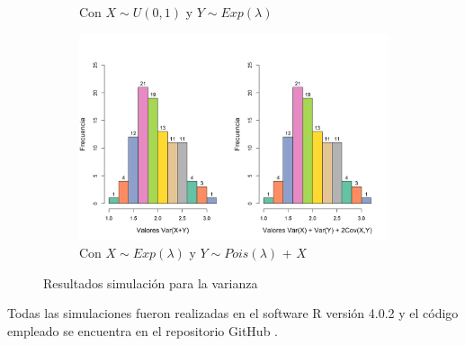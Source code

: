 \documentclass{article}
\begin{document}
\begin{figure}[h]
\begin{center}
\begin{subfigure}[b]{0.5\textwidth}
        \caption{Con $X \sim U(0,1)$ y $Y\sim Exp(\lambda)$}
    \end{subfigure}
    \begin{subfigure}[b]{0.5\textwidth}
        \includegraphics[scale=0.35]{Figures/var-exp-pois.png}
        \caption{Con $X \sim Exp(\lambda)$ y $Y \sim Pois(\lambda)$ + $X$ }
         \label{resultadosVardep}
    \end{subfigure}
    \caption{Resultados simulación para la varianza}
    \label{resultadosVar}
    \end{center}
\end{figure}

Todas las simulaciones fueron realizadas en el software R versión 4.0.2 \cite{r} y el código empleado se encuentra en el repositorio GitHub \cite{github}.



\end{document}
